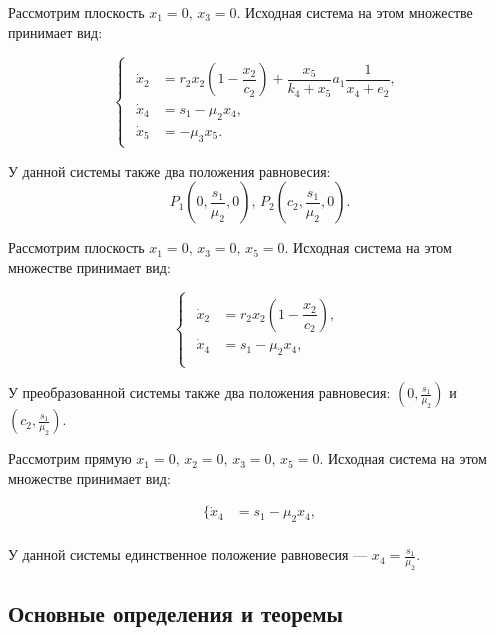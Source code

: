 \documentclass[14pt,a4paper]{extarticle}
\begin{document}
	Рассмотрим плоскость $x_1=0,\, x_3=0$. Исходная система на этом множестве принимает вид:
	
	\begin{equation*}
		\begin{cases}
			\begin{aligned}
				\dot{x}_2 &= r_2x_2\left(1-\dfrac{x_2}{c_2}\right)+\dfrac{x_5}{k_4+x_5}a_1\dfrac{1}{x_4+e_2},\\
				\dot{x}_4 &= s_1 -\mu_2x_4,\\
				\dot{x}_5 &= -\mu_3x_5.
			\end{aligned}
		\end{cases}
	\end{equation*}
	
	У данной системы также два положения равновесия:
	\[P_1\left(0,\frac{s_1}{\mu_2},0\right),\, P_2\left(c_2,\frac{s_1}{\mu_2},0\right).\]
	
	Рассмотрим плоскость $x_1=0,\, x_3=0,\, x_5=0$. Исходная система на этом множестве принимает вид:
	
	\begin{equation*}
		\begin{cases}
			\begin{aligned}
				\dot{x}_2 &= r_2x_2\left(1-\dfrac{x_2}{c_2}\right),\\
				\dot{x}_4 &= s_1 -\mu_2x_4,\\
			\end{aligned}
		\end{cases}
	\end{equation*}
	
	У преобразованной системы также два положения равновесия: $\left(0,\frac{s_1}{\mu_2}\right)$ и $\left(c_2,\frac{s_1}{\mu_2}\right)$.
	
	Рассмотрим прямую $x_1=0,\, x_2=0,\, x_3=0,\, x_5=0$. Исходная система на этом множестве принимает вид:
	
	\begin{equation*}
		\begin{aligned}
			\{\dot{x}_4 &= s_1 -\mu_2x_4,\\
		\end{aligned}
	\end{equation*}
	
	У данной системы единственное положение равновесия --- $x_4=\frac{s_1}{\mu_2}$.
	
	
	\subsection{Основные определения и теоремы}
	
\end{document}
